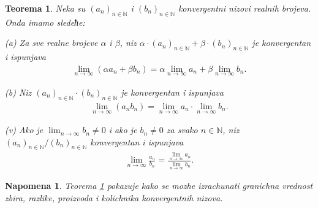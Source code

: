 \documentclass[11pt,a4paper]{article}
\newtheorem{thm}{Teorema}[section]
\newtheorem*{nap}{Napomena}
\begin{document}
\begin{thm}\label{thm3}
Neka su $(a_n)_{n\in\mathbb{N}}$ i $(b_n)_{n\in\mathbb{N}}$ konvergentni nizovi realnih brojeva. 
Onda imamo sledeћe: 

(a) Za sve realne brojeve $\alpha$ i $\beta$, 
niz $\alpha\cdot(a_n)_{n\in\mathbb{N}}+\beta\cdot(b_n)_{n\in\mathbb{N}}$
je konvergentan i ispunjava 
\begin{align*}
    \lim_{n\rightarrow\infty}
    (\alpha a_{n} + \beta b_{n} )
    =
    \alpha \lim_{n\rightarrow\infty} a_{n}
    + 
    \beta \lim_{n\rightarrow\infty} b_{n}. 
\end{align*}

(b) Niz $(a_n)_{n\in\mathbb{N}}\cdot(b_n)_{n\in\mathbb{N}}$
je konvergentan i ispunjava  
\begin{align*}
    \lim_{n\rightarrow\infty}
    (a_{n}b_{n} )
    =
    \lim_{n\rightarrow\infty} a_{n}
    \cdot
    \lim_{n\rightarrow\infty} b_{n}. 
\end{align*}

(v) Ako je $\displaystyle\lim_{n\rightarrow\infty}b_n\neq 0$ i ako je 
$b_n\neq 0$ za svako $n\in\mathbb{N}$, 
niz $(a_n)_{n\in\mathbb{N}}/(b_n)_{n\in\mathbb{N}}$
konvergentan i ispunjava  
\begin{align*}
    \lim_{n\rightarrow\infty}
    \frac{a_{n}}{b_{n} }
    =
    \frac{\displaystyle\lim_{n\rightarrow\infty} a_{n} }
    {\displaystyle\lim_{n\rightarrow\infty} b_{n} }. 
\end{align*}
\end{thm}

\begin{nap}
Teorema \ref{thm3} pokazuje kako se mozhe izrachunati 
granichna vrednost 
zbira, razlike, proizvoda i kolichnika konvergentnih nizova. 
\end{nap}
\end{document}
